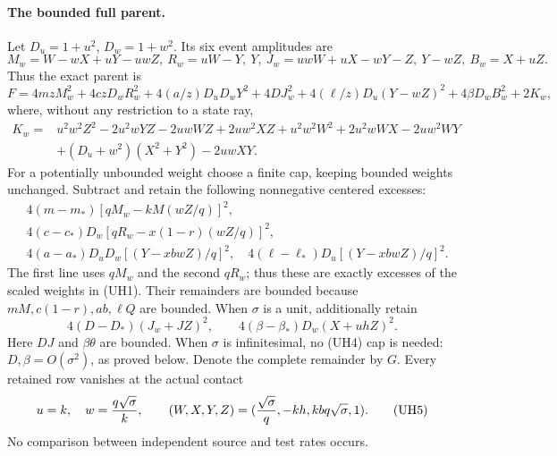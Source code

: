 \paragraph{The bounded full parent.}
Let $D_u=1+u^2$, $D_w=1+w^2$. Its six event amplitudes are
\[
 M_w=W-wX+uY-uwZ,\ R_w=uW-Y,\ Y,\
 J_w=uwW+uX-wY-Z,\ Y-wZ,\ B_w=X+uZ.
\]
Thus the exact parent is
\[
 F=4mzM_w^2+4czD_wR_w^2+4(a/z)D_uD_wY^2
 +4DJ_w^2+4(\ell/z)D_u(Y-wZ)^2+4\beta D_wB_w^2+2K_w, \tag{UH2}
\]
where, without any restriction to a state ray,
\begin{align*}
 K_w={}&u^2w^2Z^2-2u^2wYZ-2uwWZ+2uw^2XZ
       +u^2w^2W^2+2u^2wWX-2uw^2WY\\
      &+(D_u+w^2)(X^2+Y^2)-2uwXY.
\end{align*}
For a potentially unbounded weight choose a finite cap, keeping bounded
weights unchanged. Subtract and retain the following nonnegative
centered excesses:
\begin{align*}
 &4(m-m_*)[qM_w-kM(wZ/q)]^2,\\
 &4(c-c_*)D_w[qR_w-x(1-r)(wZ/q)]^2,\\
 &4(a-a_*)D_uD_w[(Y-xbwZ)/q]^2,
 \quad4(\ell-\ell_*)D_u[(Y-xbwZ)/q]^2.          \tag{UH3}
\end{align*}
The first line uses $qM_w$ and the second $qR_w$; thus these are
exactly excesses of the scaled weights in (UH1). Their remainders
are bounded because $mM,c(1-r),ab,\ell Q$ are bounded.
When $\sigma$ is a unit, additionally retain
\[
 4(D-D_*)(J_w+JZ)^2,
 \qquad4(\beta-\beta_*)D_w(X+uhZ)^2.               \tag{UH4}
\]
Here $DJ$ and $\beta\theta$ are bounded. When $\sigma$ is
infinitesimal, no (UH4) cap is needed: $D,\beta=O(\sigma^2)$,
as proved below. Denote the complete remainder by $G$.
Every retained row vanishes at the actual contact
\[
 u=k,\quad w={q\sqrt\sigma\over k},\qquad
 (W,X,Y,Z)=({\sqrt\sigma\over q},-kh,kbq\sqrt\sigma,1).
                                                               \tag{UH5}
\]
No comparison between independent source and test rates occurs.

